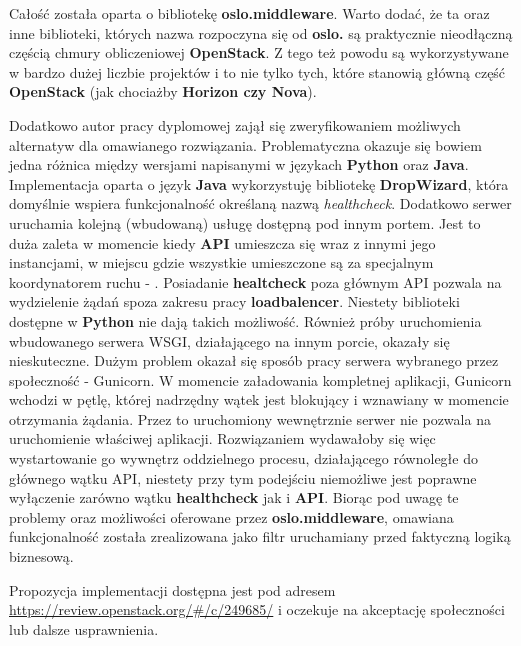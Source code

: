 Całość została oparta o bibliotekę \textbf{oslo.middleware}. Warto dodać, że ta oraz inne biblioteki, których nazwa
rozpoczyna się od \textbf{oslo.} są praktycznie nieodłączną częścią chmury obliczeniowej \textbf{OpenStack}. Z tego też powodu
są wykorzystywane w bardzo dużej liczbie projektów i to nie tylko tych, które stanowią główną część \textbf{OpenStack} (jak chociażby
\textbf{Horizon czy \textbf{Nova}}).

Dodatkowo autor pracy dyplomowej zajął się zweryfikowaniem możliwych alternatyw dla omawianego
rozwiązania. Problematyczna okazuje się bowiem jedna różnica między wersjami napisanymi w językach \textbf{Python} oraz \textbf{Java}.
Implementacja oparta o język \textbf{Java} wykorzystuję bibliotekę \textbf{DropWizard}, która domyślnie wspiera funkcjonalność określaną
nazwą \textit{healthcheck}. Dodatkowo serwer uruchamia kolejną (wbudowaną) usługę dostępną pod innym portem.
Jest to duża zaleta w momencie kiedy \textbf{API} umieszcza się wraz z innymi jego instancjami, w miejscu gdzie wszystkie umieszczone są
za specjalnym koordynatorem ruchu - . Posiadanie \textbf{healtcheck} poza głównym API pozwala
na wydzielenie żądań spoza zakresu pracy \textbf{loadbalencer}. Niestety biblioteki dostępne w \textbf{Python} nie dają takich możliwość.
Również próby uruchomienia wbudowanego serwera WSGI, działającego na innym porcie, okazały się nieskuteczne. Dużym problem okazał się
sposób pracy serwera  wybranego przez społeczność - Gunicorn. W momencie załadowania kompletnej aplikacji, Gunicorn
wchodzi w pętlę, której nadrzędny wątek jest blokujący i wznawiany w momencie otrzymania żądania. Przez to uruchomiony wewnętrznie serwer nie
pozwala na uruchomienie właściwej aplikacji. Rozwiązaniem wydawałoby się więc wystartowanie go wywnętrz oddzielnego procesu, działającego równoległe
do głównego wątku API, niestety przy tym podejściu niemożliwe jest poprawne wyłączenie zarówno wątku \textbf{healthcheck} jak i \textbf{API}.
Biorąc pod uwagę te problemy oraz możliwości oferowane przez \textbf{oslo.middleware}, omawiana funkcjonalność została zrealizowana jako filtr
uruchamiany przed faktyczną logiką biznesową. 

Propozycja implementacji dostępna jest pod adresem \url{https://review.openstack.org/#/c/249685/} i oczekuje na akceptację 
społeczności lub dalsze usprawnienia.